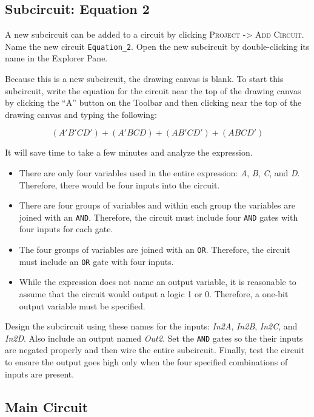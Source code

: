 \subsection{Subcircuit: Equation 2}

A new subcircuit can be added to a circuit by clicking \textsc{Project -> Add Circuit}. Name the new circuit \lstinline[columns=fixed]|Equation_2|. Open the new subcircuit by double-clicking its name in the Explorer Pane. 

Because this is a new subcircuit, the drawing canvas is blank. To start this subcircuit, write the equation for the circuit near the top of the drawing canvas by clicking the ``A'' button on the Toolbar and then clicking near the top of the drawing canvas and typing the following:

\[ (A'B'CD')+(A'BCD)+(AB'CD')+(ABCD') \]

It will save time to take a few minutes and analyze the expression. 

\begin{itemize}
	\item There are only four variables used in the entire expression: \textit{A}, \textit{B}, \textit{C}, and \textit{D}. Therefore, there would be four inputs into the circuit.
	\item There are four groups of variables and within each group the variables are joined with an \texttt{AND}. Therefore, the circuit must include four \texttt{AND} gates with four inputs for each gate.
	\item The four groups of variables are joined with an \texttt{OR}. Therefore, the circuit must include an \texttt{OR} gate with four inputs.
	\item While the expression does not name an output variable, it is reasonable to assume that the circuit would output a logic 1 or 0. Therefore, a one-bit output variable must be specified.
\end{itemize}

Design the subcircuit using these names for the inputs: \textit{In2A}, \textit{In2B}, \textit{In2C}, and \textit{In2D}. Also include an output named \textit{Out2}. Set the \texttt{AND} gates so the their inputs are negated properly and then wire the entire subcircuit. Finally, test the circuit to ensure the output goes high only when the four specified combinations of inputs are present.

\subsection{Main Circuit}


